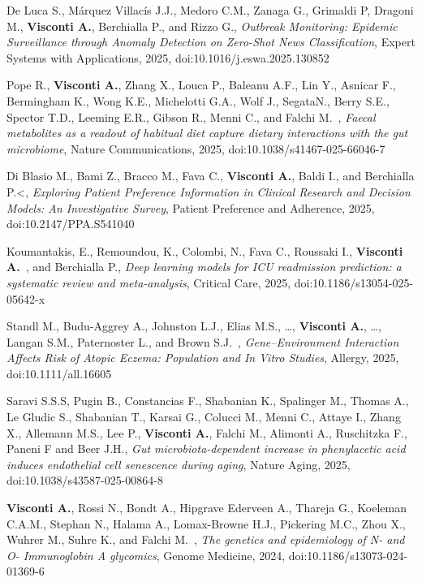\begin{itemize}
		 De Luca S.\corresponding, Márquez Villacís J.J., Medoro C.M., Zanaga G., Grimaldi P, Dragoni M., \textbf{Visconti A.}, Berchialla P., and Rizzo G.\corresponding, \emph{Outbreak Monitoring: Epidemic Surveillance through Anomaly Detection on Zero-Shot News Classification}, Expert Systems with Applications, 2025, doi:10.1016/j.eswa.2025.130852 %
		
		 Pope R., \textbf{Visconti A.}, Zhang X., Louca P., Baleanu A.F., Lin Y., Asnicar F., Bermingham K., Wong K.E., Michelotti G.A., Wolf J., SegataN., Berry S.E., Spector T.D., Leeming E.R., Gibson R., Menni C.\colast, and Falchi M.\colast ~\corresponding, \emph{Faecal metabolites as a readout of habitual diet capture dietary interactions with the gut microbiome}, Nature Communications, 2025, doi:10.1038/s41467-025-66046-7 %
		
		 Di Blasio M., Bami Z., Bracco M., Fava C., \textbf{Visconti A.}\corresponding, Baldi I.\colast, and Berchialla P.<\colast, \emph{Exploring Patient Preference Information in Clinical Research and Decision Models: An Investigative Survey}, Patient Preference and Adherence, 2025, doi:10.2147/PPA.S541040 %
		
		 Koumantakis, E., Remoundou, K., Colombi, N., Fava C., Roussaki I., \textbf{Visconti A.}\colast ~\corresponding, and Berchialla P.\colast, \emph{Deep learning models for ICU readmission prediction: a systematic review and meta-analysis}, Critical Care, 2025, doi:10.1186/s13054-025-05642-x %
		
		 Standl M.\cofirst, Budu-Aggrey A.\cofirst, Johnston L.J., Elias M.S., \dots, \textbf{Visconti A.}, \dots, Langan  S.M.\colast, Paternoster L.\colast, and Brown S.J.\colast ~\corresponding, \emph{Gene–Environment Interaction Affects Risk of Atopic Eczema: Population and In Vitro Studies}, Allergy, 2025, doi:10.1111/all.16605 %
				
		 Saravi S.S.S\corresponding, Pugin B., Constancias F., Shabanian K., Spalinger M., Thomas A., Le Gludic S., Shabanian T., Karsai G.,  Colucci M., Menni C., Attaye I., Zhang X., Allemann M.S., Lee P., \textbf{Visconti A.}, Falchi M., Alimonti A., Ruschitzka F., Paneni F and Beer J.H.\corresponding, \emph{Gut microbiota-dependent increase in phenylacetic acid induces endothelial cell senescence during aging}, Nature Aging, 2025, doi:10.1038/s43587-025-00864-8 %

		  \textbf{Visconti A.}\cofirst, Rossi N.\cofirst, Bondt A., Hipgrave Ederveen A., Thareja G., Koeleman C.A.M., Stephan N., Halama A., Lomax-Browne H.J., Pickering M.C., Zhou X., Wuhrer M.\colast, Suhre K.\colast, and Falchi M.\colast ~\corresponding, \emph{The genetics and epidemiology of N- and O- Immunoglobin A glycomics}, Genome Medicine, 2024, doi:10.1186/s13073-024-01369-6 %
		

\end{itemize}
